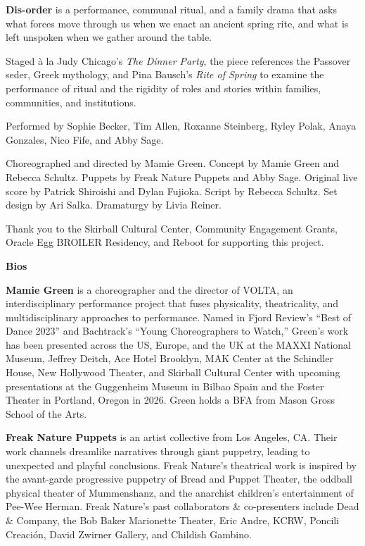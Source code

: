 \documentclass[10pt,letterpaper,landscape]{article}
\newlength{\panelwidth}
\newlength{\panelheight}
\newcommand{\panel}[1]{%
  \begin{minipage}[t][\panelheight][t]{\panelwidth}%
    \raggedright #1%
  \end{minipage}%
}
\newcommand{\panellabel}[1]{}
\newcommand{\biosize}{\fontsize{5.65}{6.35}\selectfont}
\newcommand{\copysize}{\fontsize{7.05}{7.95}\selectfont}
\begin{document}
\panel{
  \panellabel{Center Inside}
  \copysize
  \textbf{Dis-order} is a performance, communal ritual, and a family drama that asks what forces move through us when we enact an ancient spring rite, and what is left unspoken when we gather around the table.

  Staged à la Judy Chicago's \textit{The Dinner Party}, the piece references the Passover seder, Greek mythology, and Pina Bausch's \textit{Rite of Spring} to examine the performance of ritual and the rigidity of roles and stories within families, communities, and institutions.

  Performed by Sophie Becker, Tim Allen, Roxanne Steinberg, Ryley Polak, Anaya Gonzales, Nico Fife, and Abby Sage.

  Choreographed and directed by Mamie Green. Concept by Mamie Green and Rebecca Schultz. Puppets by Freak Nature Puppets and Abby Sage. Original live score by Patrick Shiroishi and Dylan Fujioka. Script by Rebecca Schultz. Set design by Ari Salka. Dramaturgy by Livia Reiner.

  Thank you to the Skirball Cultural Center, Community Engagement Grants, Oracle Egg BROILER Residency, and Reboot for supporting this project.

  \textbf{Bios}

  \biosize
  \textbf{Mamie Green} is a choreographer and the director of VOLTA, an interdisciplinary performance project that fuses physicality, theatricality, and multidisciplinary approaches to performance. Named in Fjord Review's ``Best of Dance 2023'' and Bachtrack's ``Young Choreographers to Watch,'' Green's work has been presented across the US, Europe, and the UK at the MAXXI National Museum, Jeffrey Deitch, Ace Hotel Brooklyn, MAK Center at the Schindler House, New Hollywood Theater, and Skirball Cultural Center with upcoming presentations at the Guggenheim Museum in Bilbao Spain and the Foster Theater in Portland, Oregon in 2026. Green holds a BFA from Mason Gross School of the Arts.

  \textbf{Freak Nature Puppets} is an artist collective from Los Angeles, CA. Their work channels dreamlike narratives through giant puppetry, leading to unexpected and playful conclusions. Freak Nature's theatrical work is inspired by the avant-garde progressive puppetry of Bread and Puppet Theater, the oddball physical theater of Mummenshanz, and the anarchist children's entertainment of Pee-Wee Herman. Freak Nature's past collaborators \& co-presenters include Dead \& Company, the Bob Baker Marionette Theater, Eric Andre, KCRW, Poncili Creación, David Zwirner Gallery, and Childish Gambino.
}
\end{document}
